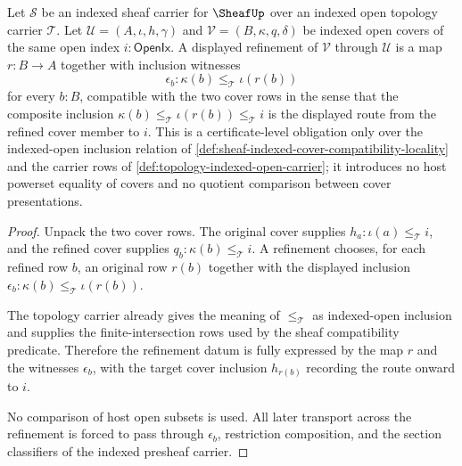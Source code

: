 \begin{theorem}
\label{thm:sheaf-cover-refinement-obligation}
Let $\mathcal{S}$ be an indexed sheaf carrier for $\SheafUp$ over an indexed open topology carrier $\mathcal{T}$. Let $\mathcal{U}=(A,\iota,h,\gamma)$ and $\mathcal{V}=(B,\kappa,q,\delta)$ be indexed open covers of the same open index $i:\mathsf{OpenIx}$. A displayed refinement of $\mathcal{V}$ through $\mathcal{U}$ is a map $r:B\to A$ together with inclusion witnesses
$$
\epsilon_b:\kappa(b)\le_{\mathcal{T}}\iota(r(b))
$$
for every $b:B$, compatible with the two cover rows in the sense that the composite inclusion $\kappa(b)\le_{\mathcal{T}}\iota(r(b))\le_{\mathcal{T}}i$ is the displayed route from the refined cover member to $i$. This is a certificate-level obligation only over the indexed-open inclusion relation of \autoref{def:sheaf-indexed-cover-compatibility-locality} and the carrier rows of \autoref{def:topology-indexed-open-carrier}; it introduces no host powerset equality of covers and no quotient comparison between cover presentations.
\end{theorem}
\begin{proof}
Unpack the two cover rows. The original cover supplies $h_a:\iota(a)\le_{\mathcal{T}}i$, and the refined cover supplies $q_b:\kappa(b)\le_{\mathcal{T}}i$. A refinement chooses, for each refined row $b$, an original row $r(b)$ together with the displayed inclusion $\epsilon_b:\kappa(b)\le_{\mathcal{T}}\iota(r(b))$.

The topology carrier already gives the meaning of $\le_{\mathcal{T}}$ as indexed-open inclusion and supplies the finite-intersection rows used by the sheaf compatibility predicate. Therefore the refinement datum is fully expressed by the map $r$ and the witnesses $\epsilon_b$, with the target cover inclusion $h_{r(b)}$ recording the route onward to $i$.

No comparison of host open subsets is used. All later transport across the refinement is forced to pass through $\epsilon_b$, restriction composition, and the section classifiers of the indexed presheaf carrier.
\end{proof}

